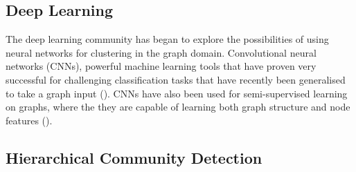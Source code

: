 \documentclass[
11pt, %
english, %
singlespacing, %
headsepline, %
]{MastersDoctoralThesis} %
\begin{document}


\subsection{Deep Learning}
The deep learning community has began to explore the possibilities of using neural networks for clustering in the graph domain. Convolutional neural networks (CNNs), powerful machine learning tools that have proven very successful for challenging classification tasks that have recently been generalised to take a graph input (\cite{defferrard2016convolutional}). 
CNNs have also been used for semi-supervised learning on graphs, where the they are capable of learning both graph structure and node features (\cite{kipf2016semi}). 

\subsection{Hierarchical Community Detection}
\end{document}
